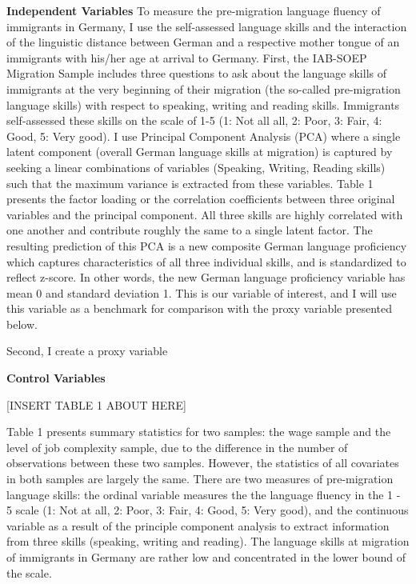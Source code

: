 \documentclass[12pt,a4paper]{article}
\begin{document}
\textbf{Independent Variables}
To measure the pre-migration language fluency of immigrants in Germany, I use the self-assessed language skills and the interaction of the linguistic distance between German and a respective mother tongue of an immigrants with his/her age at arrival to Germany. First, the IAB-SOEP Migration Sample includes three questions to ask about the language skills of immigrants at the very beginning of their migration (the so-called pre-migration language skills) with respect to speaking, writing and reading skills. Immigrants self-assessed these skills on the scale of 1-5 (1: Not all all, 2: Poor, 3: Fair, 4: Good, 5: Very good). I use Principal Component Analysis (PCA) where a single latent component (overall German language skills at migration) is captured by seeking a linear combinations of variables (Speaking, Writing, Reading skills) such that the maximum variance is extracted from these variables. Table 1 presents the factor loading or the correlation coefficients between three original variables and the principal component. All three skills are highly correlated with one another and contribute roughly the same to a single latent factor. The resulting prediction of this PCA is a new composite German language proficiency which captures characteristics of all three individual skills, and is standardized to reflect z-score. In other words, the new German language proficiency variable has mean 0 and standard deviation 1. This is our variable of interest, and I will use this variable as a benchmark for comparison with the proxy variable presented below.

Second, I create a proxy variable

\textbf{Control Variables}

\begin{center}
[INSERT TABLE 1 ABOUT HERE]
\end{center}

Table 1 presents summary statistics for two samples: the wage sample and the level of job complexity sample, due to the difference in the number of observations between these two samples. However, the statistics of all covariates in both samples are largely the same.  There are two measures of pre-migration language skills: the ordinal variable measures the the language fluency in the 1 - 5 scale (1: Not at all, 2: Poor, 3: Fair, 4: Good, 5: Very good), and the continuous variable as a result of the principle component analysis to extract information from three skills (speaking, writing and reading). The language skills at migration of immigrants in Germany are rather low and concentrated in the lower bound of the scale.
\end{document}
